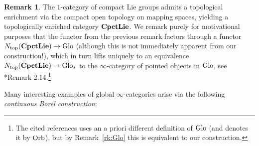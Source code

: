 \documentclass[reqno]{memo-l}
\theoremstyle{mythm}
\theoremstyle{definition}
\newtheorem{rk}[thm]{Remark}
\numberwithin{equation}{section}
\newcommand{\Ntop}{{N_\textup{top}}}
\newcommand{\cat}[1]{\textbf{\textup{#1}}}
\newcommand{\Orb}{{\vphantom{\textup{t}}\smash{\textup{Orb}}}}
\newcommand{\Glo}{\textup{Glo}}
\begin{document}
\begin{rk}
    The $1$-category of compact Lie groups admits a topological enrichment via the compact open topology on mapping spaces, yielding a topologically enriched category $\cat{CpctLie}$. We remark purely for motivational purposes that the functor from the previous remark factors through a functor $\Ntop(\cat{CpctLie})\to\Glo$ (although this is not immediately apparent from our construction!), which in turn lifts uniquely to an equivalence $\Ntop(\cat{CpctLie})\to\Glo_*$ to the $\infty$-category of pointed objects in $\Glo$, see \cite{gepnermeier2020equivTMF}*{Remark 2.14}.\footnote{The cited references uses an a priori different definition of $\Glo$ (and denotes it by $\Orb$), but by Remark~\ref{rk:Glo} this is equivalent to our construction.}
\end{rk}
    
Many interesting examples of global $\infty$-categories arise via the following \emph{continuous Borel construction}:
\end{document}
